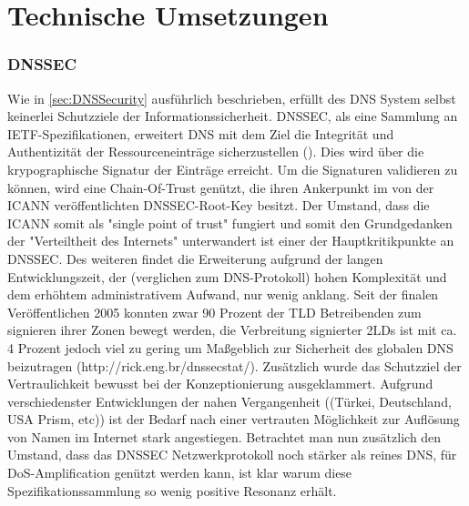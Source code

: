 \chapter{Technische Umsetzungen}

\subsection{DNSSEC}

Wie in \ref{sec:DNSSecurity} ausführlich beschrieben, erfüllt des DNS System selbst keinerlei Schutzziele der Informationssicherheit. DNSSEC, als eine Sammlung an IETF-Spezifikationen, erweitert DNS mit dem Ziel die Integrität und Authentizität der Ressourceneinträge sicherzustellen (\cite{Arends2005}). Dies wird über die krypographische Signatur der Einträge erreicht. Um die Signaturen validieren zu können, wird eine Chain-Of-Trust genützt, die ihren Ankerpunkt im von der ICANN veröffentlichten DNSSEC-Root-Key besitzt. Der Umstand, dass die ICANN somit als "single point of trust" fungiert und somit den Grundgedanken der "Verteiltheit des Internets" unterwandert ist einer der Hauptkritikpunkte an DNSSEC. Des weiteren findet die Erweiterung aufgrund der langen Entwicklungszeit, der (verglichen zum DNS-Protokoll) hohen Komplexität und dem erhöhtem administrativem Aufwand, nur wenig anklang. Seit der finalen Veröffentlichen 2005 konnten zwar 90 Prozent der TLD Betreibenden zum signieren ihrer Zonen bewegt werden, die Verbreitung signierter 2LDs ist mit ca. 4 Prozent jedoch viel zu gering um Maßgeblich zur Sicherheit des globalen DNS beizutragen (http://rick.eng.br/dnssecstat/). Zusätzlich wurde das Schutzziel der Vertraulichkeit bewusst bei der Konzeptionierung ausgeklammert. Aufgrund verschiedenster Entwicklungen der nahen Vergangenheit ((Türkei, Deutschland, USA Prism, etc)) ist der Bedarf nach einer vertrauten Möglichkeit zur Auflösung von Namen im Internet stark angestiegen. Betrachtet man nun zusätzlich den Umstand, dass das DNSSEC Netzwerkprotokoll noch stärker als reines DNS, für DoS-Amplification genützt werden kann, ist klar warum diese Spezifikationssammlung so wenig positive Resonanz erhält.


